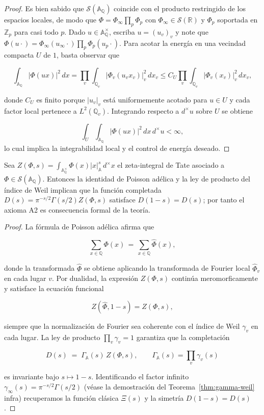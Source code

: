 \begin{proof}
Es bien sabido \cite[Cap.~I]{Tate1967} que $\mathcal{S}(\mathbb{A}_\mathbb{Q})$
coincide con el producto restringido de los espacios locales, de modo que
$\Phi=\Phi_\infty \prod_p \Phi_p$ con $\Phi_\infty \in \mathcal{S}(\mathbb{R})$ y
$\Phi_p$ soportada en $\mathbb{Z}_p$ para casi todo $p$.
Dado $u \in \mathbb{A}_\mathbb{Q}^\times$, escriba $u=(u_v)_v$ y note que
$\Phi(u\cdot)=\Phi_\infty(u_\infty\cdot)\prod_p \Phi_p(u_p\cdot)$.
Para acotar la energía en una vecindad compacta $U$ de $1$, basta observar que

\[
 \int_{\mathbb{A}_\mathbb{Q}} \bigl|\Phi(u x)\bigr|^2\,dx
 = \prod_v \int_{\mathbb{Q}_v} \bigl|\Phi_v(u_v x_v)\bigr|_v^2\,dx_v
 \leqslant C_U \prod_v \int_{\mathbb{Q}_v} \bigl|\Phi_v(x_v)\bigr|_v^2\,dx_v,
\]

donde $C_U$ es finito porque $|u_v|_v$ está uniformemente acotado para $u\in U$
y cada factor local pertenece a $L^2(\mathbb{Q}_v)$.  Integrando respecto a
$d^\times u$ sobre $U$ se obtiene

\[
 \int_U \int_{\mathbb{A}_\mathbb{Q}} \bigl|\Phi(u x)\bigr|^2\,dx\,d^\times u
 < \infty,
\]
lo cual implica la integrabilidad local y el control de energía deseado.
\end{proof}

\begin{lemma}
Sea $Z(\Phi,s)=\int_{\mathbb{A}_\mathbb{Q}^\times}\Phi(x)|x|_\mathbb{A}^s\,d^\times x$
el zeta-integral de Tate asociado a $\Phi \in \mathcal{S}(\mathbb{A}_\mathbb{Q})$.
Entonces la identidad de Poisson adélica y la ley de producto del índice de Weil
implican que la función completada $D(s)=\pi^{-s/2}\Gamma(s/2)Z(\Phi,s)$ satisface
$D(1-s)=D(s)$; por tanto el axioma A2 es consecuencia formal de la teoría.
\end{lemma}

\begin{proof}
La fórmula de Poisson adélica afirma que \cite[Cap.~I]{Tate1967}

\[
 \sum_{x\in\mathbb{Q}} \Phi(x) \,=\, \sum_{x\in\mathbb{Q}} \widehat{\Phi}(x),
\]

donde la transformada $\widehat{\Phi}$ se obtiene aplicando la transformada de
Fourier local $\widehat{\Phi}_v$ en cada lugar $v$.  Por dualidad, la expresión
$Z(\Phi,s)$ continúa meromorficamente y satisface la ecuación funcional

\[
 Z(\widehat{\Phi},1-s)=Z(\Phi,s),
\]

siempre que la normalización de Fourier sea coherente con el índice de Weil
$\gamma_v$ en cada lugar.  La ley de producto \cite[\S{}II.3]{Weil1964}
$\prod_v \gamma_v=1$ garantiza que la completación

\[
 D(s)\;=\;\Gamma_\mathbb{A}(s)\,Z(\Phi,s),\qquad
 \Gamma_\mathbb{A}(s)=\prod_v \gamma_v(s)
\]

es invariante bajo $s\mapsto 1-s$.  Identificando el factor infinito
$\gamma_\infty(s)=\pi^{-s/2}\Gamma(s/2)$ (véase la demostración del
Teorema~\ref{thm:gamma-weil} infra) recuperamos la función clásica $\Xi(s)$ y la
simetría $D(1-s)=D(s)$.
\end{proof}

